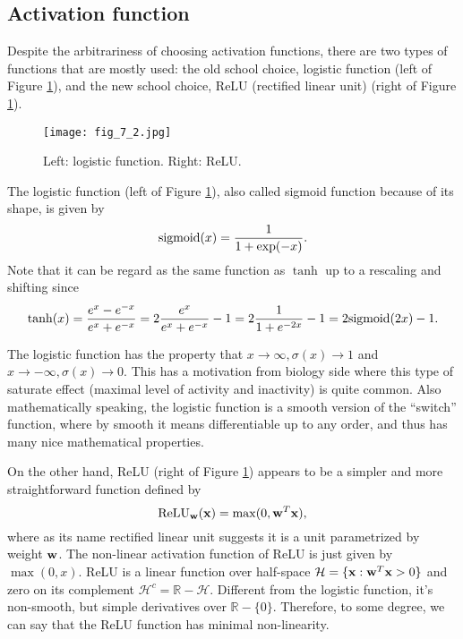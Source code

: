 \documentclass[../main.tex]{subfiles}
\begin{document}
\subsection{Activation function}
Despite the arbitrariness of choosing activation functions, there are two types of functions that are mostly used: the old school choice, logistic function (left of Figure \ref{fig_7_2}), and the new school choice, ReLU (rectified linear unit) (right of Figure \ref{fig_7_2}).
\begin{figure}[h] 
	\centering 
	\texttt{[image: fig\_7\_2.jpg]} 
	\caption{Left: logistic function. Right: ReLU.}\label{fig_7_2}
\end{figure}
\par The logistic function (left of Figure \ref{fig_7_2}), also called sigmoid function because of its shape, is given by
\begin{equation*}
{\rm sigmoid}(x) = \frac{1}{1+\exp(-x)}.
\end{equation*}
Note that it can be regard as the same function as $\tanh$ up to a rescaling and shifting since
\begin{equation*}
\tanh(x)=\frac{e^{x}-e^{ -x}}{e^{ x}+e^{ -x}} = 2\frac{e^{ x}}{e^{ x}+e^{ -x}} -1=2\frac{1}{1+e^{-2{ x}}} - 1= 2 {\rm sigmoid}(2{ x})-1.
\end{equation*}
\par The logistic function has the property that $x\rightarrow \infty,\sigma(x)\rightarrow 1$ and $x\rightarrow -\infty,\sigma(x)\rightarrow0$. This has a motivation from biology side where this type of saturate effect (maximal level of activity and inactivity) is quite common. Also mathematically speaking, the logistic function is a smooth version of the ``switch'' function, where by smooth it means differentiable up to any order, and thus has many nice mathematical properties.
\par On the other hand, ReLU (right of Figure \ref{fig_7_2}) appears to be a simpler and more straightforward function defined by
\begin{equation*}
{\rm ReLU}_{\bf w}({\bf x})=\max(0,{\bf w}^T{\bf x}),
\end{equation*}
where as its name rectified linear unit suggests it is a unit parametrized by weight ${\bf w}$. The non-linear activation function of ReLU is just given by $\max(0, x)$. ReLU is a linear function over half-space $\mathcal{H}=\{{\bf x}:{\bf w}^T{\bf x}>0\}$ and zero on its complement $\mathcal{H}^c=\mathbb{R}-\mathcal{H}$. Different from the logistic function, it's non-smooth, but simple derivatives over $\mathbb{R}-\{0\}$. Therefore, to some degree, we can say that the ReLU function has minimal non-linearity.
\end{document}
